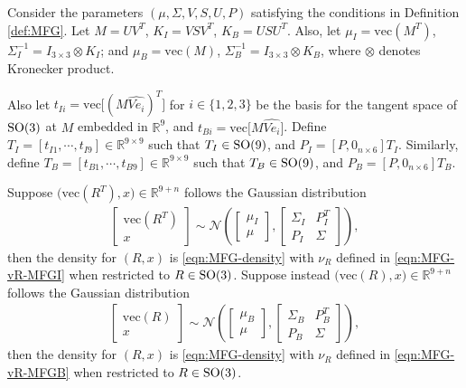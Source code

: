 \begin{theorem} \label{thm:MFG-construction}
	Consider the parameters $(\mu,\allowbreak \Sigma,\allowbreak V,\allowbreak S,\allowbreak U,\allowbreak P)$ satisfying the conditions in Definition \ref{def:MFG}.
	Let $M = UV^T$, $K_I = VSV^T$, $K_B = USU^T$.
	Also, let $\mu_I = \mathrm{vec}(M^T)$, $\Sigma_I^{-1} = I_{3\times 3}\otimes K_I$; and $\mu_B = \mathrm{vec}(M)$, $\Sigma_B^{-1} = I_{3\times 3}\otimes K_B$, where $\otimes$ denotes Kronecker product.
	
	Also let $t_{Ii} = \mathrm{vec}\big[(M\widehat{Ve_i})^T\big]$ for $i\in\{1,2,3\}$ be the basis for the tangent space of $\mathrm{SO}(3)$ at $M$ embedded in $\mathbb{R}^9$, and $t_{Bi} = \mathrm{vec}\big[M\widehat{Ve_i}\big]$.
	Define $T_I = [t_{I1},\cdots,t_{I9}] \in \mathbb{R}^{9\times 9}$ such that $T_I\in\mathrm{SO}(9)$, and $P_I = [P,0_{n\times 6}]T_I$.
	Similarly, define $T_B = [t_{B1},\cdots,t_{B9}] \in \mathbb{R}^{9\times 9}$ such that $T_B\in\mathrm{SO}(9)$, and $P_B = [P,0_{n\times 6}]T_B$.
	
	Suppose $\big(\mathrm{vec}(R^T),x\big)\in\mathbb{R}^{9+n}$ follows the Gaussian distribution
	\begin{align} \label{eqn:MFG-construct-condition-MFGI}
		\begin{bmatrix} \mathrm{vec}(R^T) \\ x \end{bmatrix} 
		\sim \mathcal{N}\! \left(
		\begin{bmatrix} \mu_I \\ \mu \end{bmatrix},
		\begin{bmatrix}
			\Sigma_I & P_I^T \\
			P_I & \Sigma
		\end{bmatrix} \right),
	\end{align}
	then the density for $(R,x)$ is \eqref{eqn:MFG-density} with $\nu_R$ defined in \eqref{eqn:MFG-vR-MFGI} when restricted to $R\in\mathrm{SO}(3)$.
	Suppose instead $\big(\mathrm{vec}(R),x\big)\in\mathbb{R}^{9+n}$ follows the Gaussian distribution
	\begin{align} \label{eqn:MFG-construct-condition-MFGB}
		\begin{bmatrix} \mathrm{vec}(R) \\ x \end{bmatrix} 
		\sim \mathcal{N}\! \left(
		\begin{bmatrix} \mu_B \\ \mu \end{bmatrix},
		\begin{bmatrix}
			\Sigma_B & P_B^T \\
			P_B & \Sigma
		\end{bmatrix} \right),
	\end{align}
	then the density for $(R,x)$ is \eqref{eqn:MFG-density} with $\nu_R$ defined in \eqref{eqn:MFG-vR-MFGB} when restricted to $R\in\mathrm{SO}(3)$.
\end{theorem}
